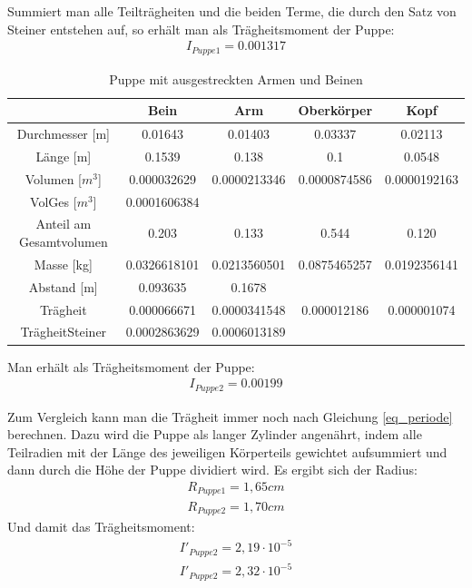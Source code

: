 Summiert man alle Teilträgheiten und die beiden Terme, die durch den Satz von Steiner entstehen auf, so erhält man als Trägheitsmoment der Puppe:
\begin{align*}
I_{Puppe 1}= 0.001317
\end{align*}

\begin{table}[htbp]
\begin{tabular}{|c|c|c|c|c|}
\hline 		
&	Bein&	Arm	&Oberkörper	&Kopf	\\ \hline	
Durchmesser [m]	&0.01643&	0.01403	&0.03337	&0.02113	\\ \hline		
Länge [m]	&0.1539	&0.138	&0.1	&0.0548\\ \hline	
Volumen [$m^3$]	&0.000032629	&0.0000213346	&0.0000874586	&0.0000192163\\ \hline	
VolGes [$m^3$]	&0.0001606384	&&&		\\ \hline	
Anteil am Gesamtvolumen&	0.203	&0.133&	0.544	&0.120\\ \hline
Masse [kg]	&0.0326618101&	0.0213560501	&0.0875465257	&0.0192356141\\ \hline	
Abstand [m]&	0.093635	&0.1678&&\\ \hline	
Trägheit&	0.000066671&	0.0000341548&	0.000012186&	0.000001074\\ \hline	
TrägheitSteiner&	0.0002863629&	0.0006013189&&	\\ \hline	
\end{tabular} 
\caption{Puppe mit ausgestreckten Armen und Beinen}
\end{table}

Man erhält als Trägheitsmoment der Puppe:
\begin{align*}
I_{Puppe 2}=0.00199
\end{align*}

Zum Vergleich kann man die Trägheit immer noch nach Gleichung \eqref{eq_periode} berechnen. Dazu wird die Puppe als langer Zylinder angenährt, indem alle Teilradien mit der Länge des jeweiligen Körperteils gewichtet aufsummiert und dann durch die Höhe der Puppe dividiert wird. Es ergibt sich der Radius:
\begin{align*}
R_{Puppe 1}=1,65cm\\
R_{Puppe 2}=1,70cm
\end{align*}
Und damit das Trägheitsmoment:
\begin{align*}
I'_{Puppe 2}=2,19\cdot10^{-5}\\
I'_{Puppe 2}=2,32\cdot10^{-5}
\end{align*}

